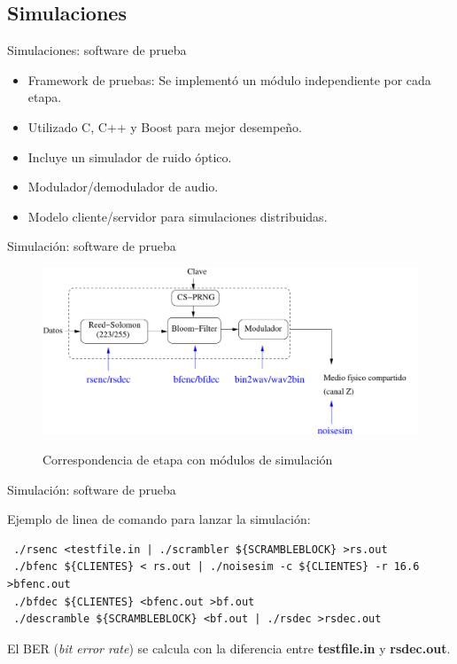 \documentclass[aspectratio=169]{beamer}
\begin{document}
\subsection{Simulaciones}

\begin{frame}{Simulaciones: software de prueba}


  \begin{itemize}
  \item Framework de pruebas: Se implementó un módulo independiente por cada etapa.
  \item Utilizado C, C++ y Boost para mejor desempeño.
  \item Incluye un simulador de ruido óptico.
  \item Modulador/demodulador de audio.
  \item Modelo cliente/servidor para simulaciones distribuidas.
  \end{itemize}


\end{frame}

\begin{frame}{Simulación: software de prueba}

  \begin{figure}[t]
    \includegraphics[width=0.90 \textwidth]{../graphs/Soft-stack-sim} 
    
    Correspondencia de etapa con módulos de simulación
\end{figure}


\end{frame}

\begin{frame}[fragile]{Simulación: software de prueba}

Ejemplo de linea de comando para lanzar la simulación:

\small
\begin{verbatim}
 ./rsenc <testfile.in | ./scrambler ${SCRAMBLEBLOCK} >rs.out
 ./bfenc ${CLIENTES} < rs.out | ./noisesim -c ${CLIENTES} -r 16.6 >bfenc.out
 ./bfdec ${CLIENTES} <bfenc.out >bf.out
 ./descramble ${SCRAMBLEBLOCK} <bf.out | ./rsdec >rsdec.out
\end{verbatim}
\normalsize

El BER (\textit{bit error rate}) se calcula con la diferencia entre \textbf{testfile.in} y \textbf{rsdec.out}.
\end{frame}
\end{document}
